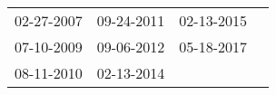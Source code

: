 \begin{supertabular}{llll}
 02-27-2007 &  09-24-2011 &  02-13-2015 \\
 07-10-2009 &  09-06-2012 &  05-18-2017 \\
 08-11-2010 &  02-13-2014 &             \\
\end{supertabular}
